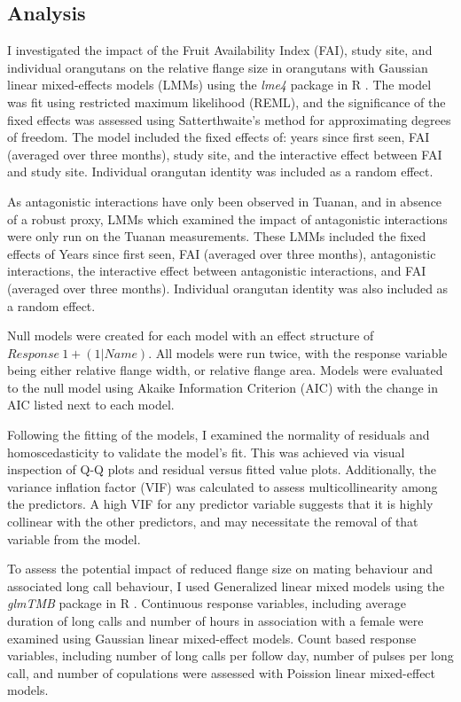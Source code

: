 \subsection{Analysis}

I investigated the impact of the Fruit Availability Index (FAI), study site, and individual orangutans on the relative flange size in orangutans with Gaussian linear mixed-effects models (LMMs) using the \textit{lme4} package in R \citep{Bates.2015}. The model was fit using restricted maximum likelihood (REML), and the significance of the fixed effects was assessed using Satterthwaite's method for approximating degrees of freedom. The model included the fixed effects of: years since first seen, FAI (averaged over three months), study site, and the interactive effect between FAI and study site. Individual orangutan identity was included as a random effect. 

As antagonistic interactions have only been observed in Tuanan, and in absence of a robust proxy, LMMs which examined the impact of antagonistic interactions were only run on the Tuanan measurements. These LMMs included the fixed effects of Years since first seen, FAI (averaged over three months), antagonistic interactions, the interactive effect between antagonistic interactions, and FAI (averaged over three months). Individual orangutan identity was also included as a random effect. 

Null models were created for each model with an effect structure of \(Response ~ 1 + (1|Name)\). All models were run twice, with the response variable being either relative flange width, or relative flange area. Models were evaluated to the null model using Akaike Information Criterion (AIC) with the change in AIC listed next to each model. 

Following the fitting of the models, I examined the normality of residuals and homoscedasticity to validate the model's fit. This was achieved via visual inspection of Q-Q plots and residual versus fitted value plots. Additionally, the variance inflation factor (VIF) was calculated to assess multicollinearity among the predictors. A high VIF for any predictor variable suggests that it is highly collinear with the other predictors, and may necessitate the removal of that variable from the model. 

To assess the potential impact of reduced flange size on mating behaviour and associated long call behaviour, I used Generalized linear mixed models using the \textit{glmTMB} package in R \citep{Brooks.2017}. Continuous response variables, including average duration of long calls and number of hours in association with a female were examined using Gaussian linear mixed-effect models. Count based response variables, including number of long calls per follow day, number of pulses per long call, and number of copulations were assessed with Poission linear mixed-effect models.

